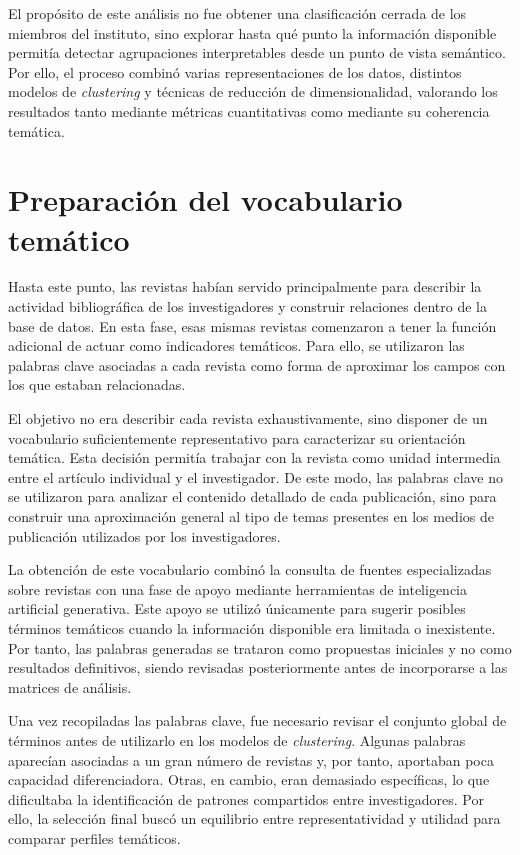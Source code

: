 \documentclass[11pt,spanish,listoffigures,listoftables]{tfgetsinf}
\begin{document}
El propósito de este análisis no fue obtener una clasificación cerrada de los miembros del instituto, sino explorar hasta qué punto la información disponible permitía detectar agrupaciones interpretables desde un punto de vista semántico. Por ello, el proceso combinó varias representaciones de los datos, distintos modelos de \textit{clustering} y técnicas de reducción de dimensionalidad, valorando los resultados tanto mediante métricas cuantitativas como mediante su coherencia temática.

\section{Preparación del vocabulario temático}

Hasta este punto, las revistas habían servido principalmente para describir la actividad bibliográfica de los investigadores y construir relaciones dentro de la base de datos. En esta fase, esas mismas revistas comenzaron a tener la función adicional de actuar como indicadores temáticos. Para ello, se utilizaron las palabras clave asociadas a cada revista como forma de aproximar los campos con los que estaban relacionadas.

El objetivo no era describir cada revista exhaustivamente, sino disponer de un vocabulario suficientemente representativo para caracterizar su orientación temática. Esta decisión permitía trabajar con la revista como unidad intermedia entre el artículo individual y el investigador. De este modo, las palabras clave no se utilizaron para analizar el contenido detallado de cada publicación, sino para construir una aproximación general al tipo de temas presentes en los medios de publicación utilizados por los investigadores.

La obtención de este vocabulario combinó la consulta de fuentes especializadas sobre revistas con una fase de apoyo mediante herramientas de inteligencia artificial generativa. Este apoyo se utilizó únicamente para sugerir posibles términos temáticos cuando la información disponible era limitada o inexistente. Por tanto, las palabras generadas se trataron como propuestas iniciales y no como resultados definitivos, siendo revisadas posteriormente antes de incorporarse a las matrices de análisis.

Una vez recopiladas las palabras clave, fue necesario revisar el conjunto global de términos antes de utilizarlo en los modelos de \textit{clustering}. Algunas palabras aparecían asociadas a un gran número de revistas y, por tanto, aportaban poca capacidad diferenciadora. Otras, en cambio, eran demasiado específicas, lo que dificultaba la identificación de patrones compartidos entre investigadores. Por ello, la selección final buscó un equilibrio entre representatividad y utilidad para comparar perfiles temáticos.
\end{document}
